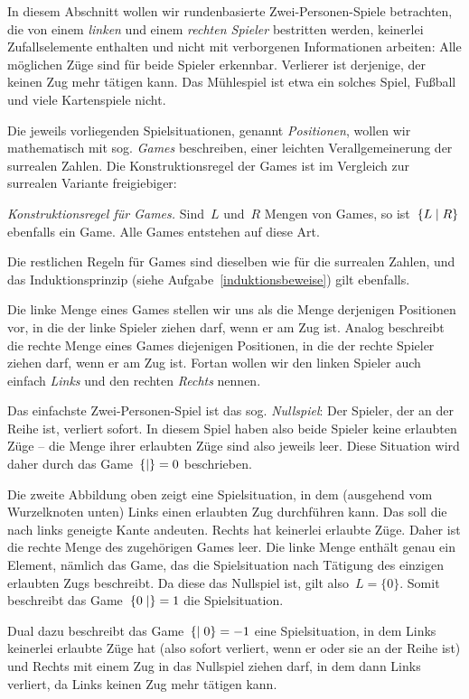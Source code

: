 \documentclass{zirkelblatt}
\begin{document}
In diesem Abschnitt wollen wir rundenbasierte Zwei-Personen-Spiele betrachten,
die von einem \emph{linken} und einem \emph{rechten Spieler} bestritten werden,
keinerlei Zufallselemente enthalten und nicht mit verborgenen Informationen
arbeiten: Alle möglichen Züge sind für beide Spieler erkennbar. Verlierer ist
derjenige, der keinen Zug mehr tätigen kann. Das Mühlespiel ist etwa ein
solches Spiel, Fußball und viele Kartenspiele nicht.

Die jeweils vorliegenden Spielsituationen, genannt \emph{Positionen}, wollen wir
mathematisch mit sog. \emph{Games} beschreiben, einer leichten
Verallgemeinerung der surrealen Zahlen. Die Konstruktionsregel der Games ist
im Vergleich zur surrealen Variante freigiebiger:

\emph{Konstruktionsregel für Games.}
Sind~$L$ und~$R$ Mengen von Games,
so ist~$\{ L \mathrel{|} R \}$ ebenfalls ein Game. Alle Games entstehen auf diese Art.

Die restlichen Regeln für Games sind dieselben wie für die surrealen Zahlen,
und das Induktionsprinzip (siehe Aufgabe~\ref{induktionsbeweise}) gilt
ebenfalls.

Die linke Menge eines Games stellen wir uns als die Menge derjenigen Positionen
vor, in die der linke Spieler ziehen darf, wenn er am Zug ist. Analog
beschreibt die rechte Menge eines Games diejenigen Positionen, in die der rechte
Spieler ziehen darf, wenn er am Zug ist. Fortan wollen wir den linken Spieler
auch einfach \emph{Links} und den rechten \emph{Rechts} nennen.

Das einfachste Zwei-Personen-Spiel ist das sog. \emph{Nullspiel}: Der Spieler,
der an der Reihe ist, verliert sofort. In diesem Spiel haben also beide Spieler
keine erlaubten Züge -- die Menge ihrer erlaubten Züge sind also jeweils leer.
Diese Situation wird daher durch das Game~$\{  \mathrel{|}  \} = 0$ beschrieben.

Die zweite Abbildung oben zeigt eine Spielsituation, in dem (ausgehend vom Wurzelknoten
unten) Links einen erlaubten Zug durchführen kann. Das soll die
nach links geneigte Kante andeuten. Rechts hat keinerlei erlaubte
Züge. Daher ist die rechte Menge des zugehörigen Games leer. Die linke Menge
enthält genau ein Element, nämlich das Game, das die Spielsituation nach
Tätigung des einzigen erlaubten Zugs beschreibt. Da diese das Nullspiel ist,
gilt also~$L = \{ 0 \}$. Somit beschreibt das Game~$\{ 0 \mathrel{|}  \} = 1$ die
Spielsituation.

Dual dazu beschreibt das Game~$\{  \mathrel{|} 0 \} = -1$ eine Spielsituation, in dem
Links keinerlei erlaubte Züge hat (also sofort verliert, wenn er oder sie an der
Reihe ist) und Rechts mit einem Zug in das Nullspiel ziehen darf, in dem
dann Links verliert, da Links keinen Zug mehr tätigen kann.
\end{document}
